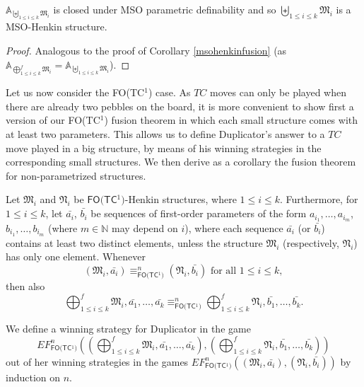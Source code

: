 \documentclass{LMCS}
\newcommand{\frM}{\mathfrak{M}}
\newcommand{\frN}{\mathfrak{N}}
\newcommand{\mso}{\textsf{MSO}\xspace}
\newcommand{\fotc}{\textsf{FO(TC$^1$)}\xspace}
\begin{document}
\begin{cor}
$\mathbb{A}_{\biguplus_{ 1 \leq i \leq k} \frM_i}$ is closed
under \mso parametric definability and so $\biguplus_{ 1 \leq i \leq k} \frM_i$ is a \mso-Henkin
structure.\label{msohenkinunion}
\end{cor}
\begin{proof}
Analogous to the proof of Corollary \ref{msohenkinfusion} (as
$\mathbb{A}_{\bigoplus_{1\leq i\leq k}^f\frM_i}=\mathbb{A}_{\biguplus_{ 1 \leq i \leq k} \frM_i}$).
\end{proof}


Let us now consider the \fotc case. As $TC$ moves can only be played when there are already two pebbles on the board, it is more convenient to show first a version of our \fotc fusion theorem in which each small structure comes with at least two parameters. This allows us to define Duplicator's answer to a $TC$ move played in a big structure, by means of his winning strategies in the corresponding small structures. We then derive as a corollary the fusion theorem for non-parametrized structures.

\begin{thm}[Fusion Theorem for \fotc]
Let $\mathfrak{M}_i$ and $\mathfrak{N}_i$ be $\fotc$-Henkin
structures, where $1\leq i\leq k$. Furthermore, for $1\leq i\leq k$, 
let $\bar{a_i}$, $\bar{b_i}$ be sequences of first-order
parameters of the form $a_{i_1},\ldots,a_{i_m}$,
$b_{i_1},\ldots,b_{i_m}$ (where
$m\in\mathbb{N}$ may depend on $i$), where each sequence $\bar{a_i}$
(or  $\bar{b_i}$) contains at least two
distinct elements, unless the structure $\mathfrak{M}_i$
(respectively, $\mathfrak{N}_i$) has
only one element. Whenever $$(\frM_i,\bar{a_i})\equiv_\fotc^n(\frN_i,\bar{b_i})\text{ for
all }1 \leq i \leq k,$$
then also $$\bigoplus_{1\leq i\leq k}^f \frM_i,
\bar{a_1},\ldots,\bar{a_k}\equiv_\fotc^n \bigoplus_{1\leq
i\leq k}^f \frN_i,\bar{b_1},\ldots,\bar{b_k}.$$ 
\end{thm}


\proof
We define a winning strategy for Duplicator in the game
$$EF_\fotc^n((\bigoplus_{ 1 \leq i \leq k}^f \frM_i,
\bar{a_1},\ldots,\bar{a_k}), (\bigoplus_{1\leq i \leq k}^f
\frN_i, \bar{b_1},\ldots,\bar{b_k}))$$ out of her winning
strategies in the games
$EF_\fotc^n((\frM_i,\bar{a_i}),(\frN_i,\bar{b_i}))$ by induction
on $n$.
\end{document}
